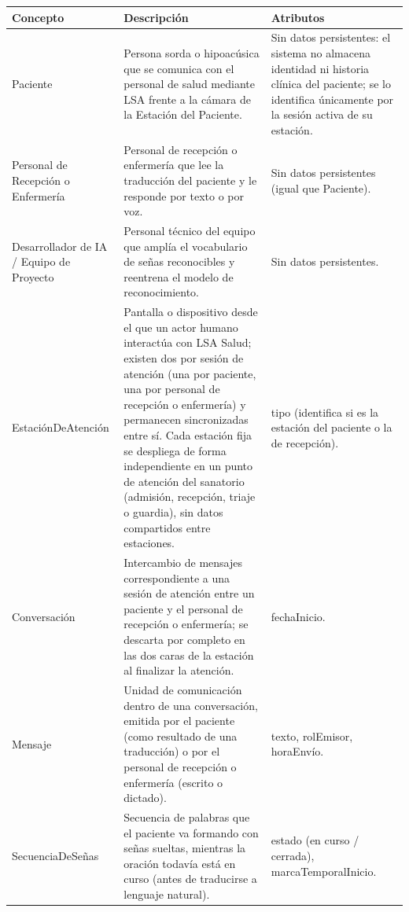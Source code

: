 \begin{longtable}{p{3.6cm} p{5.4cm} p{5.4cm}}
    \toprule
    \textbf{Concepto} & \textbf{Descripción} & \textbf{Atributos} \\
    \midrule
    \endhead
    Paciente &
    Persona sorda o hipoacúsica que se comunica con el personal de salud
    mediante LSA frente a la cámara de la Estación del Paciente. &
    Sin datos persistentes: el sistema no almacena identidad ni historia
    clínica del paciente; se lo identifica únicamente por la sesión activa
    de su estación. \\

    Personal de Recepción o Enfermería &
    Personal de recepción o enfermería que lee la traducción del paciente
    y le responde por texto o por voz. &
    Sin datos persistentes (igual que Paciente). \\

    Desarrollador de IA / Equipo de Proyecto &
    Personal técnico del equipo que amplía el vocabulario de señas
    reconocibles y reentrena el modelo de reconocimiento. &
    Sin datos persistentes. \\

    Estación\-De\-Atención &
    Pantalla o dispositivo desde el que un actor humano interactúa con
    LSA Salud; existen dos por sesión de atención (una por paciente, una
    por personal de recepción o enfermería) y permanecen sincronizadas
    entre sí. Cada estación fija se despliega de forma independiente en un
    punto de atención del sanatorio (admisión, recepción, triaje o
    guardia), sin datos compartidos entre estaciones. &
    tipo (identifica si es la estación del paciente o la de recepción). \\

    Conversación &
    Intercambio de mensajes correspondiente a una sesión de atención entre
    un paciente y el personal de recepción o enfermería; se descarta por
    completo en las dos caras de la estación al finalizar la atención. &
    fechaInicio. \\

    Mensaje &
    Unidad de comunicación dentro de una conversación, emitida por el
    paciente (como resultado de una traducción) o por el personal de
    recepción o enfermería (escrito o dictado). &
    texto, rolEmisor, horaEnvío. \\

    Secuencia\-De\-Señas &
    Secuencia de palabras que el paciente va formando con señas sueltas,
    mientras la oración todavía está en curso (antes de traducirse a
    lenguaje natural). &
    estado (en curso / cerrada), marcaTemporalInicio. \\


\end{longtable}
